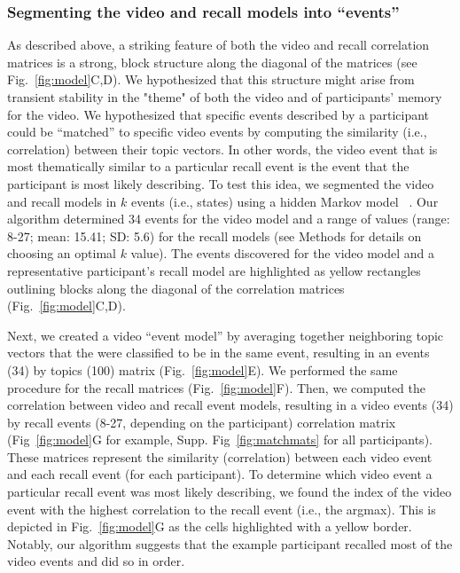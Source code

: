 \documentclass{article}
\begin{document}
\subsubsection*{Segmenting the video and recall models into ``events''}
As described above, a striking feature of both the video and recall correlation matrices is a strong, block structure along the diagonal of the matrices (see Fig.~\ref{fig:model}C,D).  We hypothesized that this structure might arise from transient stability in the "theme" of both the video and of participants' memory for the video. We hypothesized that specific events described by a participant could be ``matched'' to specific video events by computing the similarity (i.e., correlation) between their topic vectors. In other words, the video event that is most thematically similar to a particular recall event is the event that the participant is most likely describing. To test this idea, we segmented the video and recall models in $k$ events (i.e., states) using a hidden Markov model ~\citep{BaldEtal17}. Our algorithm determined 34 events for the video model and a range of values (range: 8-27; mean: 15.41; SD: 5.6) for the recall models (see Methods for details on choosing an optimal $k$ value).  The events discovered for the video model and a representative participant's recall model are highlighted as yellow rectangles outlining blocks along the diagonal of the correlation matrices (Fig.~\ref{fig:model}C,D).

Next, we created a video ``event model'' by averaging together neighboring topic vectors that the were classified to be in the same event, resulting in an events (34) by topics (100) matrix (Fig.~\ref{fig:model}E).  We performed the same procedure for the recall matrices (Fig.~\ref{fig:model}F). Then, we computed the correlation between video and recall event models, resulting in a video events (34) by recall events (8-27, depending on the participant) correlation matrix (Fig~\ref{fig:model}G for example, Supp. Fig~\ref{fig:matchmats} for all participants). These matrices represent the similarity (correlation) between each video event and each recall event (for each participant). To determine which video event a particular recall event was most likely describing, we found the index of the video event with the highest correlation to the recall event (i.e., the argmax).  This is depicted in Fig.~\ref{fig:model}G as the cells highlighted with a yellow border. Notably, our algorithm suggests that the example participant recalled most of the video events and did so in order.
\end{document}
